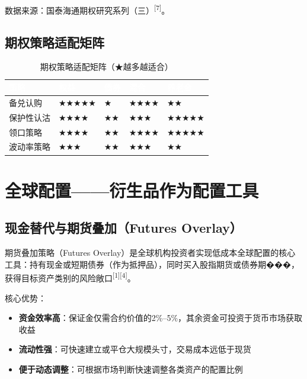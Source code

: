\documentclass[10pt,a4paper,twocolumn]{ctexart}
\begin{document}
{\scriptsize 数据来源：国泰海通期权研究系列（三）\textsuperscript{[7]}。}

\subsection{期权策略适配矩阵}

\begin{table}[H]
\centering\scriptsize
\caption{期权策略适配矩阵（★越多越适合）}
\label{tab:matrix}
\renewcommand{\arraystretch}{1.25}
\setlength{\tabcolsep}{3pt}
\begin{tabularx}{\columnwidth}{@{}XC{0.9cm}C{0.9cm}C{0.9cm}C{0.9cm}@{}}
\toprule
{}
\textcolor{white}{\textbf{策略}} &
\textcolor{white}{\textbf{权益}} &
\textcolor{white}{\textbf{债券}} &
\textcolor{white}{\textbf{混合}} &
\textcolor{white}{\textbf{养老金}} \\
\midrule
备兑认购   & ★★★★★ & ★     & ★★★★  & ★★ \\
保护性认沽 & ★★★★  & ★★    & ★★★   & ★★★★★ \\
领口策略   & ★★★★  & ★★    & ★★★★  & ★★★★★ \\
波动率策略 & ★★★   & ★★    & ★★★   & ★★ \\
\bottomrule
\end{tabularx}
\end{table}


\section{全球配置——衍生品作为配置工具}

\subsection{现金替代与期货叠加（Futures Overlay）}

期货叠加策略（Futures Overlay）是全球机构投资者实现低成本全球配置的核心工具：持有现金或短期债券（作为抵押品），同时买入股指期货或债券期���，获得目标资产类别的风险敞口\textsuperscript{[1][4]}。

核心优势：
\begin{itemize}
  \item \textbf{资金效率高}：保证金仅需合约价值的2\%--5\%，其余资金可投资于货币市场获取收益
  \item \textbf{流动性强}：可快速建立或平仓大规模头寸，交易成本远低于现货
  \item \textbf{便于动态调整}：可根据市场判断快速调整各类资产的配置比例
\end{itemize}
\end{document}
